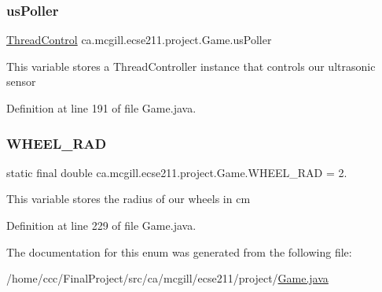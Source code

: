 \subsubsection{\texorpdfstring{us\+Poller}{usPoller}}
{\footnotesize\ttfamily \hyperlink{classca_1_1mcgill_1_1ecse211_1_1threads_1_1_thread_control}{Thread\+Control} ca.\+mcgill.\+ecse211.\+project.\+Game.\+us\+Poller}

This variable stores a Thread\+Controller instance that controls our ultrasonic sensor 

Definition at line 191 of file Game.\+java.

\mbox{\label{enumca_1_1mcgill_1_1ecse211_1_1project_1_1_game_a91bd64670c2a91d006c907142783b1f8}} 
\subsubsection{\texorpdfstring{W\+H\+E\+E\+L\+\_\+\+R\+AD}{WHEEL\_RAD}}
{\footnotesize\ttfamily  static  final double ca.\+mcgill.\+ecse211.\+project.\+Game.\+W\+H\+E\+E\+L\+\_\+\+R\+AD = 2.\hspace{0.3cm}{\ttfamily [static]}}

This variable stores the radius of our wheels in cm 

Definition at line 229 of file Game.\+java.



The documentation for this enum was generated from the following file\+:\begin{DoxyCompactItemize}
\item 
/home/ccc/\+Final\+Project/src/ca/mcgill/ecse211/project/\hyperlink{_game_8java}{Game.\+java}\end{DoxyCompactItemize}
